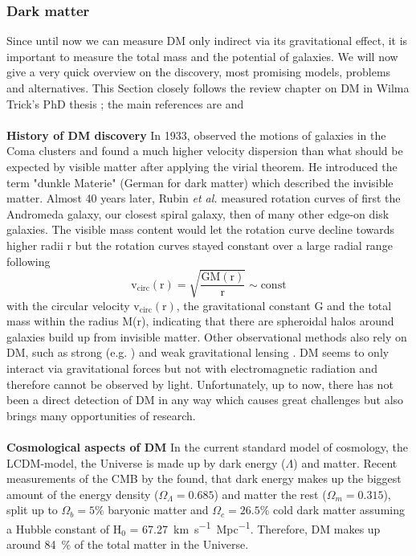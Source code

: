 \subsubsection{Dark matter}
Since until now we can measure \ac{DM} only indirect via its gravitational effect, it is important to measure the total mass and the potential of galaxies. We will now give a very quick overview on the discovery, most promising models, problems and alternatives. This Section closely follows the review chapter on \ac{DM} in Wilma Trick's PhD thesis \citep{Wilmathesis}; the main references are \citet{Ostriker...DM...2003, Maoz...astrophysics...2007} and \citet{Mo...galformev...2010} \\
\\\textbf{History of \ac{DM} discovery} In 1933, \citeauthor{Zwicky...DM...1933} observed the motions of galaxies in the Coma clusters and found a much higher velocity dispersion than what should be expected by visible matter after applying the virial theorem. He introduced the term "dunkle Materie" (German for dark matter) which described the invisible matter. Almost 40 years later, Rubin \textit{et al.} \citeyearpar{Rubin...DM...1970, Rubin...DM...1978, Rubin...DM...1980} measured rotation curves of first the Andromeda galaxy, our closest spiral galaxy, then of many other edge-on disk galaxies. The visible mass content would let the rotation curve decline towards higher radii r but the rotation curves stayed constant over a large radial range following 
\begin{equation}\label{eq:circ_vel}
    \mathrm{v_{circ}(r)} = \sqrt{\frac{\mathrm{GM(r)}}{\mathrm{r}}} \sim \mathrm{const}
\end{equation}
with the circular velocity $\mathrm{v_{circ}(r)}$, the gravitational constant G and the total mass within the radius M(r), indicating that there are spheroidal halos around galaxies build up from invisible matter. Other observational methods also rely on \ac{DM}, such as strong (e.g. \cite{Trick..stronglensing...2016}) and weak gravitational lensing \citep{Tyson...weaklensing...1990, Kaiser...weaklensing...1993}. \ac{DM} seems to only interact via gravitational forces but not with electromagnetic radiation and therefore cannot be observed by light. Unfortunately, up to now, there has not been a direct detection of \ac{DM} in any way which causes great challenges but also brings many opportunities of research.\\
\\\textbf{Cosmological aspects of \ac{DM}}
In the current standard model of cosmology, the \ac{LCDM}-model, the Universe is made up by dark energy ($\Lambda$) and matter. Recent measurements of the \ac{CMB} by the \citet{Planck...CMB...2018} found, that dark energy makes up the biggest amount of the energy density ($\Omega_\Lambda = 0.685$) and matter the rest ($\Omega_m = 0.315$), split up to $\Omega_b = 5\%$ baryonic matter and $\Omega_c = 26.5\%$ cold dark matter assuming a Hubble constant of H$_0$ =  \SI{67.27}{km.s^{-1}.Mpc^{-1}}. Therefore, \ac{DM} makes up around \SI{84}{\%} of the total matter in the Universe. \\
